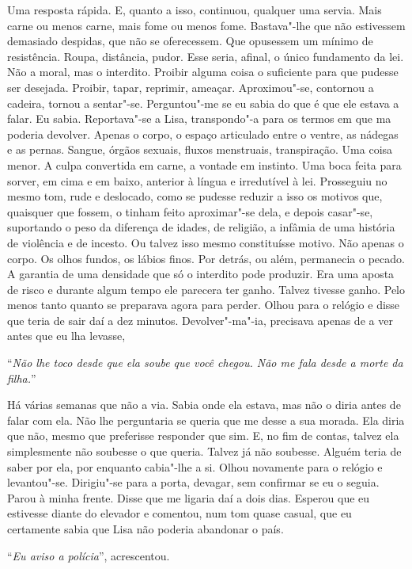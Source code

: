 Uma resposta rápida. E, quanto a isso, continuou, qualquer uma servia.
Mais carne ou menos carne, mais fome ou menos fome. Bastava"-lhe que não
estivessem demasiado despidas, que não se oferecessem. Que opusessem um
mínimo de resistência. Roupa, distância, pudor. Esse seria, afinal, o
único fundamento da lei. Não a moral, mas o interdito. Proibir alguma
coisa o suficiente para que pudesse ser desejada. Proibir, tapar,
reprimir, ameaçar. Aproximou"-se, contornou a cadeira, tornou a
sentar"-se. Perguntou"-me se eu sabia do que é que ele estava a falar.
Eu sabia. Reportava"-se a Lisa, transpondo"-a para os termos em que ma
poderia devolver. Apenas o corpo, o espaço articulado entre o ventre, as
nádegas e as pernas. Sangue, órgãos sexuais, fluxos menstruais,
transpiração. Uma coisa menor. A culpa convertida em carne, a vontade em
instinto. Uma boca feita para sorver, em cima e em baixo, anterior à
língua e irredutível à lei. Prosseguiu no mesmo tom, rude e deslocado,
como se pudesse reduzir a isso os motivos que, quaisquer que fossem, o
tinham feito aproximar"-se dela, e depois casar"-se, suportando o peso
da diferença de idades, de religião, a infâmia de uma história de
violência e de incesto. Ou talvez isso mesmo constituísse motivo. Não
apenas o corpo. Os olhos fundos, os lábios finos. Por detrás, ou além,
permanecia o pecado. A garantia de uma densidade que só o interdito pode
produzir. Era uma aposta de risco e durante algum tempo ele parecera ter
ganho. Talvez tivesse ganho. Pelo menos tanto quanto se preparava agora
para perder. Olhou para o relógio e disse que teria de sair daí a dez
minutos. Devolver"-ma"-ia, precisava apenas de a ver antes que eu lha
levasse,

``\emph{Não lhe toco desde que ela soube que você chegou. Não me fala
desde a morte da filha.}''

Há várias semanas que não a via. Sabia onde ela estava, mas não o diria
antes de falar com ela. Não lhe perguntaria se queria que me desse a sua
morada. Ela diria que não, mesmo que preferisse responder que sim. E, no
fim de contas, talvez ela simplesmente não soubesse o que queria. Talvez
já não soubesse. Alguém teria de saber por ela, por enquanto cabia"-lhe
a si. Olhou novamente para o relógio e levantou"-se. Dirigiu"-se para a
porta, devagar, sem confirmar se eu o seguia. Parou à minha frente.
Disse que me ligaria daí a dois dias. Esperou que eu estivesse diante do
elevador e comentou, num tom quase casual, que eu certamente sabia que
Lisa não poderia abandonar o país.

``\emph{Eu aviso a polícia}'',
acrescentou.

